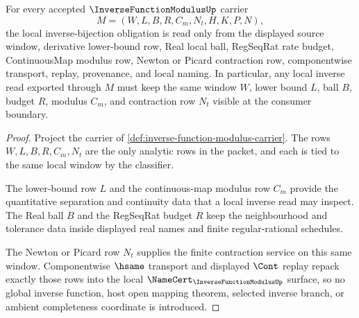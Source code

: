 \begin{theorem}
\label{thm:inverse-function-modulus-local-bijection-obligation}
For every accepted $\InverseFunctionModulusUp$ carrier
$$
M=(W,L,B,R,C_m,N_t,H,K,P,N),
$$
the local inverse-bijection obligation is read only from the displayed source window, derivative lower-bound row, Real local ball, RegSeqRat rate budget, ContinuousMap modulus row, Newton or Picard contraction row, componentwise transport, replay, provenance, and local naming. In particular, any local inverse read exported through $M$ must keep the same window $W$, lower bound $L$, ball $B$, budget $R$, modulus $C_m$, and contraction row $N_t$ visible at the consumer boundary.
\end{theorem}
\begin{proof}
Project the carrier of \autoref{def:inverse-function-modulus-carrier}. The rows $W,L,B,R,C_m,N_t$ are the only analytic rows in the packet, and each is tied to the same local window by the classifier.

The lower-bound row $L$ and the continuous-map modulus row $C_m$ provide the quantitative separation and continuity data that a local inverse read may inspect. The Real ball $B$ and the RegSeqRat budget $R$ keep the neighbourhood and tolerance data inside displayed real names and finite regular-rational schedules.

The Newton or Picard row $N_t$ supplies the finite contraction service on this same window. Componentwise $\hsame$ transport and displayed $\Cont$ replay repack exactly those rows into the local $\NameCert_{\InverseFunctionModulusUp}$ surface, so no global inverse function, host open mapping theorem, selected inverse branch, or ambient completeness coordinate is introduced.
\end{proof}

